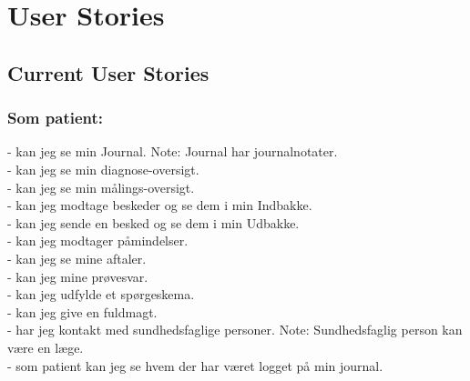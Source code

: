 %
%
%
%
%
%
\section{User Stories}
\subsection{Current User Stories} %
\subsubsection*{Som patient:}
- kan jeg se min Journal. Note: Journal har journalnotater. \\
- kan jeg se min diagnose-oversigt.\\
- kan jeg se min målings-oversigt.\\
- kan jeg modtage beskeder og se dem i min Indbakke.\\
- kan jeg sende en besked og se dem i min Udbakke.\\
- kan jeg modtager påmindelser.\\
- kan jeg se mine aftaler. \\
- kan jeg mine prøvesvar.\\
- kan jeg udfylde et spørgeskema.\\
- kan jeg give en fuldmagt. \\
- har jeg kontakt med sundhedsfaglige personer. Note: Sundhedsfaglig person kan være en læge. \\
- som patient kan jeg se hvem der har været logget på min journal.
